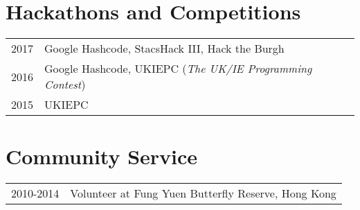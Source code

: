 \documentclass{article}
\begin{document}
\section*{Hackathons and Competitions}
\begin{tabular}{r|p{14cm}}
\textsc{2017} & Google Hashcode, StacsHack III, Hack the Burgh \\
\textsc{2016} & Google Hashcode, UKIEPC (\textit{The UK/IE Programming Contest}) \\
\textsc{2015} & UKIEPC \\
\end{tabular}
\section*{Community Service}
\begin{tabular}{r|p{14cm}}
\textsc{2010-2014} & Volunteer at Fung Yuen Butterfly Reserve, Hong Kong \\
\end{tabular}
\end{document}
